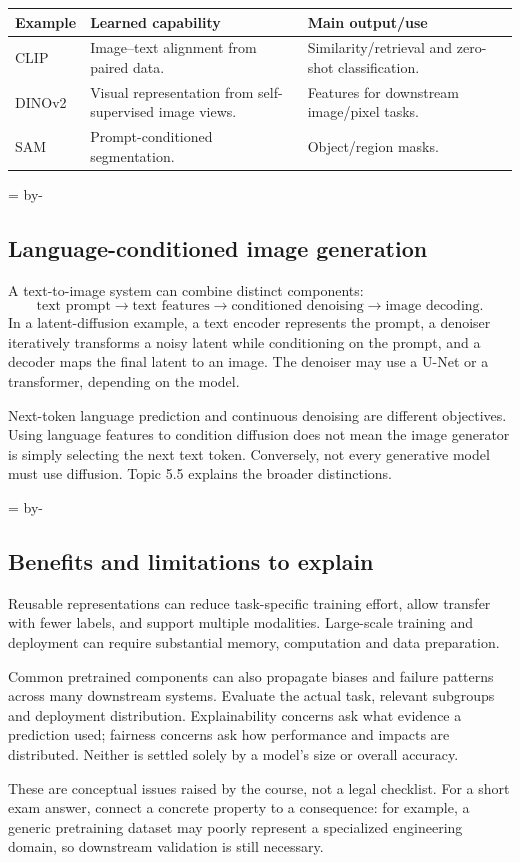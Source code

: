 \documentclass[11pt]{article}
\newcommand{\newsubsection}[1]{\par\begingroup\skip0=\pagegoal\advance\skip0 by-\pagetotal\ifdim\skip0<12\baselineskip\newpage\fi\endgroup\subsection{#1}}
\begin{document}
\begin{longtable}{@{}P{.18\textwidth}P{.32\textwidth}P{.40\textwidth}@{}}
\toprule Example & Learned capability & Main output/use\\\midrule\endhead
CLIP & Image--text alignment from paired data. & Similarity/retrieval and zero-shot classification.\\
DINOv2 & Visual representation from self-supervised image views. & Features for downstream image/pixel tasks.\\
SAM & Prompt-conditioned segmentation. & Object/region masks.\\\bottomrule
\end{longtable}

\newsubsection{Language-conditioned image generation}
A text-to-image system can combine distinct components:
\[
\text{text prompt}\longrightarrow\text{text features}
\longrightarrow\text{conditioned denoising}
\longrightarrow\text{image decoding}.
\]
In a latent-diffusion example, a text encoder represents the prompt, a denoiser iteratively transforms a noisy latent while conditioning on the prompt, and a decoder maps the final latent to an image. The denoiser may use a U-Net or a transformer, depending on the model.

Next-token language prediction and continuous denoising are different objectives. Using language features to condition diffusion does not mean the image generator is simply selecting the next text token. Conversely, not every generative model must use diffusion. Topic 5.5 explains the broader distinctions.

\newsubsection{Benefits and limitations to explain}
Reusable representations can reduce task-specific training effort, allow transfer with fewer labels, and support multiple modalities. Large-scale training and deployment can require substantial memory, computation and data preparation.

Common pretrained components can also propagate biases and failure patterns across many downstream systems. Evaluate the actual task, relevant subgroups and deployment distribution. Explainability concerns ask what evidence a prediction used; fairness concerns ask how performance and impacts are distributed. Neither is settled solely by a model's size or overall accuracy.

These are conceptual issues raised by the course, not a legal checklist. For a short exam answer, connect a concrete property to a consequence: for example, a generic pretraining dataset may poorly represent a specialized engineering domain, so downstream validation is still necessary.
\end{document}
